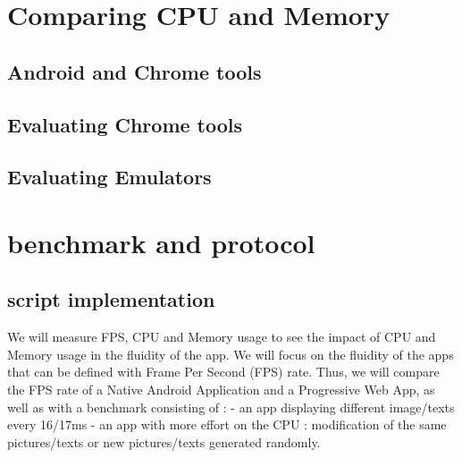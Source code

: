 \fi
    
\section{Comparing CPU and Memory}
    \subsection{Android and Chrome tools}
    \subsection{Evaluating Chrome tools}
    \subsection{Evaluating Emulators}
\section{benchmark and protocol}

\iffalse
The smoothness metric defined previously depends in Progressive Web Apps on the rendering path taken by the frame. Thus, the benchmark application will have 2 features : one favouring Main Frames and the other favouring Basic Frames. The easiest way to trigger a Main Frame is to change the content of the screen. This can be done with a single click. A Basic Frame is basely triggered  
\fi
\subsection{script implementation}
\iffalse
We will focus on the fluidity of the apps that can be defined with Frame Per Second (FPS) rate.
Thus, we will compare the FPS rate of a Native Android Application and a Progressive Web App, as well as with a benchmark consisting of : 
    - an app displaying different image/texts every 16/17ms
    - an app with more effort on the CPU : modification of the same pictures/texts or new pictures/texts generated randomly.

\newline
\fi

We will measure FPS, CPU and Memory usage to see the impact of CPU and Memory usage in the fluidity of the app.
\newline
We will focus on the fluidity of the apps that can be defined with Frame Per Second (FPS) rate.
Thus, we will compare the FPS rate of a Native Android Application and a Progressive Web App, as well as with a benchmark consisting of : 
    - an app displaying different image/texts every 16/17ms
    - an app with more effort on the CPU : modification of the same pictures/texts or new pictures/texts generated randomly.
\newline

